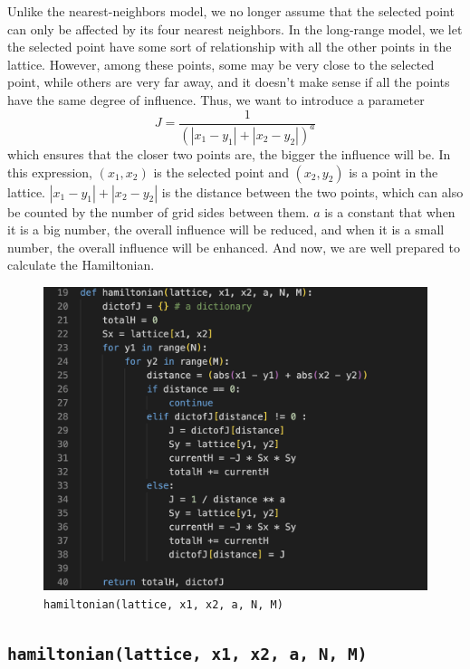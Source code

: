 \documentclass[11pt]{book}
\begin{document}
Unlike the nearest-neighbors model, we no longer assume that the selected point can only be affected by its four nearest neighbors. In the long-range model, we let the selected point have some sort of relationship with all the other points in the lattice. However, among these points, some may be very close to the selected point, while others are very far away, and it doesn't make sense if all the points have the same degree of influence. Thus, we want to introduce a parameter 
\[
J = \frac{1}{(\left| x_1 - y_1 \right| + \left| x_2 - y_2 \right|)^a}
\]
which ensures that the closer two points are, the bigger the influence will be. In this expression, $(x_1, x_2)$ is the selected point and $(x_2, y_2)$ is a point in the lattice. $\left| x_1 - y_1 \right| + \left| x_2 - y_2 \right|$ is the distance between the two points, which can also be counted by the number of grid sides between them. $a$ is a constant that when it is a big number, the overall influence will be reduced, and when it is a small number, the overall influence will be enhanced. And now, we are well prepared to calculate the Hamiltonian.

\begin{figure}
    \centering
    \includegraphics[width=1\linewidth]{lr_hamiltonian.png}
    \caption{\texttt{hamiltonian(lattice, x1, x2, a, N, M)}}
    \label{fig46}
\end{figure}

\subsection{\texttt{hamiltonian(lattice, x1, x2, a, N, M)}}
\end{document}
